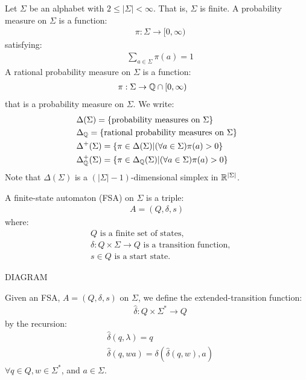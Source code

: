 \documentclass[../main.tex]{subfiles}
\begin{document}
Let $\Sigma$ be an alphabet with $2 \leq |\Sigma| < \infty$. That is, $\Sigma$
is finite.
A probability measure on $\Sigma$ is a function:
\begin{align*}
    & \pi: \Sigma \rightarrow [0, \infty)
\end{align*}
satisfying:
\begin{align*}
    & \sum_{a \in \Sigma} \pi(a) = 1
\end{align*}
A rational probability measure on $\Sigma$ is a function:
\begin{align*}
    & \pi: \Sigma \rightarrow \mathbb{Q} \cap [0, \infty)
\end{align*}
that is a probability measure on $\Sigma$.
We write:
\begin{align*}
    & \Delta(\Sigma) = \{ \text{probability measures on $\Sigma$} \} \\
    & \Delta_{\mathbb{Q}} = \{ \text{rational probability measures on $\Sigma$} \} \\
    & \Delta^{+}(\Sigma) = \{ \pi \in \Delta(\Sigma) | (\forall a \in \Sigma) \pi(a) > 0 \} \\
    & \Delta^{+}_{\mathbb{Q}}(\Sigma) = \{ \pi \in \Delta_{\mathbb{Q}}(\Sigma) | (\forall a \in \Sigma) \pi(a) > 0 \} \\
\end{align*}
Note that $\Delta(\Sigma)$ is a $(|\Sigma| - 1)$-dimensional simplex in $\mathbb{R}^{|\Sigma|}$.

\begin{defn}
    A finite-state automaton (FSA) on $\Sigma$ is a triple:
    \begin{align*}
        A = (Q, \delta, s)
    \end{align*}
    where:
    \begin{align*}
        & Q \text{ is a finite set of states,} \\
        & \delta:Q\times\Sigma \rightarrow Q \text{ is a transition function,} \\
        & s \in Q \text{ is a start state.}
    \end{align*}
\end{defn}

\begin{exmp}
    DIAGRAM
\end{exmp}

Given an FSA, $A = (Q, \delta, s)$ on $\Sigma$, we define the extended-transition
function:
\begin{align*}
    & \hat{\delta}:Q\times\Sigma^{*} \rightarrow Q
\end{align*}
by the recursion:
\begin{align*}
    & \hat{\delta}(q, \lambda) = q \\
    & \hat{\delta}(q, wa) = \delta(\hat{\delta}(q, w), a)
\end{align*}
$\forall q \in Q, w \in \Sigma^{*}$, and $a \in \Sigma$.
\end{document}
